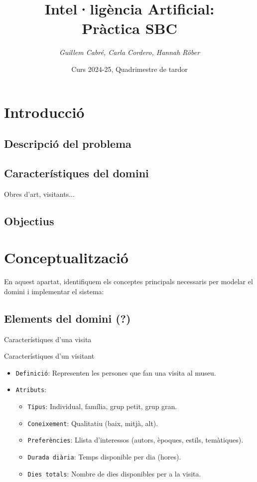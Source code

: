 \documentclass[a4paper]{article}
\title{\textbf{Intel·ligència Artificial:\\
		Pràctica SBC}}
\author{\emph{Guillem Cabré, Carla Cordero, Hannah Röber}}
\date{Curs 2024-25, Quadrimestre de tardor}
\begin{document}
	
	\begin{titlepage}
		\clearpage\maketitle
		\thispagestyle{empty}
	\end{titlepage}
	
	\tableofcontents
	\clearpage
	
	\section{Introducció}
	
	\subsection{Descripció del problema}
	
	\subsection{Característiques del domini}
	
	Obres d'art, visitants...\\
	
	\subsection{Objectius}
	
	
	
	\section{Conceptualització}
	
	En aquest apartat, identifiquem els conceptes principals necessaris per modelar el domini i implementar el sistema:
	
	\subsection{Elements del domini (?)}
	
	Característiques d'una visita
	
	
	Característiques d'un visitant
	\begin{itemize}
		\item \texttt{Definició}: Representen les persones que fan una visita al museu.
		\item \texttt{Atributs}:
		\begin{itemize}
			\item \texttt{Tipus}: Individual, família, grup petit, grup gran.
			\item \texttt{Coneixement}: Qualitatiu (baix, mitjà, alt).
			\item \texttt{Preferències}: Llista d’interessos (autors, èpoques, estils, temàtiques).
			\item \texttt{Durada diària}: Temps disponible per dia (hores).
			\item \texttt{Dies totals}: Nombre de dies disponibles per a la visita.
		\end{itemize}
	\end{itemize}
	
\end{document}
